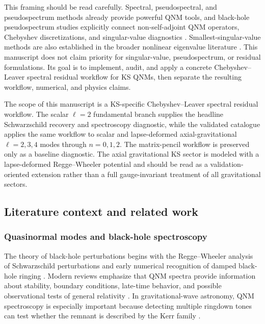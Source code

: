 ﻿\documentclass[12pt,a4paper]{article}
\begin{document}
This framing should be read carefully. Spectral, pseudospectral, and pseudospectrum methods already provide powerful QNM tools, and black-hole pseudospectrum studies explicitly connect non-self-adjoint QNM operators, Chebyshev discretizations, and singular-value diagnostics \cite{Jansen2017,Jaramillo2021,Cao2024}. Smallest-singular-value methods are also established in the broader nonlinear eigenvalue literature \cite{Sadkane2023}. This manuscript does not claim priority for singular-value, pseudospectrum, or residual formulations. Its goal is to implement, audit, and apply a concrete Chebyshev--Leaver spectral residual workflow for KS QNMs, then separate the resulting workflow, numerical, and physics claims.

The scope of this manuscript is a KS-specific Chebyshev--Leaver spectral residual workflow. The scalar \(\ell=2\) fundamental branch supplies the headline Schwarzschild recovery and spectroscopy diagnostic, while the validated catalogue applies the same workflow to scalar and lapse-deformed axial-gravitational \(\ell=2,3,4\) modes through \(n=0,1,2\). The matrix-pencil workflow is preserved only as a baseline diagnostic. The axial gravitational KS sector is modeled with a lapse-deformed Regge--Wheeler potential and should be read as a validation-oriented extension rather than a full gauge-invariant treatment of all gravitational sectors.

\subsection{Literature context and related work}

\subsubsection{Quasinormal modes and black-hole spectroscopy}

The theory of black-hole perturbations begins with the Regge--Wheeler analysis of Schwarzschild perturbations \cite{Regge1957} and early numerical recognition of damped black-hole ringing \cite{Vishveshwara1970}. Modern reviews emphasize that QNM spectra provide information about stability, boundary conditions, late-time behavior, and possible observational tests of general relativity \cite{Kokkotas1999,Berti2009,Konoplya2011}. In gravitational-wave astronomy, QNM spectroscopy is especially important because detecting multiple ringdown tones can test whether the remnant is described by the Kerr family \cite{Berti2006,Isi2019}.
\end{document}
